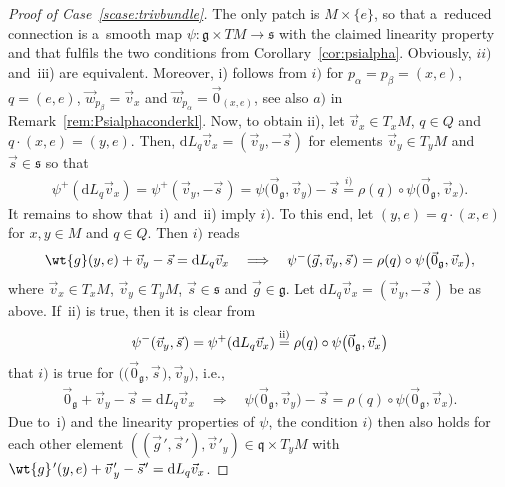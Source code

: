 \documentclass[pdftex]{sigma}
\numberwithin{equation}{section}
\begin{document}
\begin{proof}[Proof of Case~\ref{scase:trivbundle}]
The only patch is $M\times\{e\}$, so that a~reduced connection is a~smooth
map $\psi\colon \mathfrak{g}\times TM \rightarrow \mathfrak{s}$ with the claimed linearity property
and that fulf\/ils the
two conditions from Corollary~\ref{cor:psialpha}.
Obviously, $ii)$ and~iii) are equivalent.
Moreover, i) follows from $i)$ for $p_\alpha=p_\beta=(x,e)$, $q=(e,e)$, $\vec{w}_{p_\beta}=\vec{v}_x$
and $\vec{w}_{p_\alpha}=\vec{0}_{(x,e)}$, see also $a)$ in Remark~\ref{rem:Psialphaconderkl}.
Now, to obtain ii), let $\vec{v}_x\in T_xM$, $q\in Q$ and $q\cdot (x,e)=(y,e)$.
Then, $\mathrm{d} L_q\vec{v}_x=(\vec{v}_y,-\vec{s})$ for elements $\vec{v}_y\in T_yM$ and $\vec{s}\in \mathfrak{s}$ so
that
\begin{gather*}
\psi^+(\mathrm{d}
L_q\vec{v}_x)=\psi^+(\vec{v}_y,-\vec{s}\hspace{1pt})=\psi\big(\vec{0}_{\mathfrak{g}},\vec{v}_y\big)-\vec{s}
\stackrel{i)}{=}\rho(q)\circ\psi\big(\vec{0}_{\mathfrak{g}},\vec{v}_x\big).
\end{gather*}
It remains to show that~i) and~ii) imply $i)$.
To this end, let $(y,e)=q\cdot (x,e)$ for $x,y\in M$ and $q\in Q$.
Then $i)$ reads
\begin{gather*}
\wt{g}(y,e)+ \vec{v}_{y}-\vec{s}=\mathrm{d} L_q\vec{v}_{x}
\quad
\Longrightarrow
\quad
\psi^-(\vec{g},\vec{v}_{y},\vec{s}\hspace{1pt})=\rho(q)\circ\psi\big(\vec{0}_{\mathfrak{g}},\vec{v}_{x}\big),
\end{gather*}
where $\vec{v}_{x}\in T_xM$, $\vec{v}_{y}\in T_yM$, $\vec{s}\in \mathfrak{s}$ and $\vec{g}\in \mathfrak{g}$.
Let $\mathrm{d} L_q\vec{v}_x=(\vec{v}_y,-\vec{s}\hspace{1pt})$ be as above.
If~ii) is true, then it is clear from
\begin{gather*}
\psi^{-}(\vec{v}_y,\vec{s}\hspace{1pt})=\psi^+(\mathrm{d} L_q\vec{v}_x)\stackrel{\rm ii)}{=} \rho(q)\circ
\psi\big(\vec{0}_{\mathfrak{g}},\vec{v}_x\big)
\end{gather*}
that $i)$ is true for $\big(\big(\vec{0}_{\mathfrak{g}},\vec{s}\hspace{1pt}),\vec{v}_y\big)$, i.e.,
\begin{gather*}
\vec{0}_{\mathfrak{g}}+\vec{v}_y-\vec{s}=\mathrm{d} L_q\vec{v}_{x}
\quad
\Longrightarrow
\quad
\psi\big(\vec{0}_{\mathfrak{g}},\vec{v}_y\big)-\vec{s}=\rho(q)\circ \psi\big(\vec{0}_{\mathfrak{g}},\vec{v}_x\big).
\end{gather*}
Due to~i) and the linearity properties of $\psi$, the condition $i)$ then also holds for each other
element $((\vec{g}\hspace{1pt}{}',\vec{s}\hspace{1pt}{}'),\vec{v}\hspace{1pt}{}'_y)\in \mathfrak{q}\times T_yM$ with
$\wt{g}\hspace{1pt}{}'(y,e)+ \vec{v}\hspace{1pt}{}'_{y}-\vec{s}\hspace{1pt}{}'=\mathrm{d} L_q\vec{v}_{x}$.
\end{proof}
\end{document}

